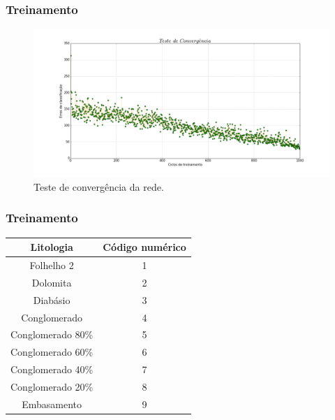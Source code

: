 \documentclass[aspectratio=10]{beamer} %
\begin{document}
\begin{frame}
\frametitle{Treinamento}
\begin{figure}[H]
\centering
\includegraphics[scale=0.2]{Imagens/conv070917.png}
\caption{Teste de convergência da rede.}
\label{convergencia}
\end{figure} 
\end{frame}

\begin{frame}
	\frametitle{Treinamento}
	\begin{table}[H]
		\centering
		\begin{tabular}{c|c}
			
			Litologia                    & Código numérico \\ %
			\hline                                                             %
			Folhelho 2                 &  1\\
			Dolomita  		            &  2 \\
			Diabásio    	            &  3 \\
			Conglomerado          &  4 \\
			Conglomerado 80\% &  5  \\
			Conglomerado 60\%&  6 \\
			Conglomerado 40\%&  7\\
			Conglomerado 20\%&  8 \\
			Embasamento          &  9 \\
			
		\end{tabular}
	\end{table}
\end{frame}

\end{document}

